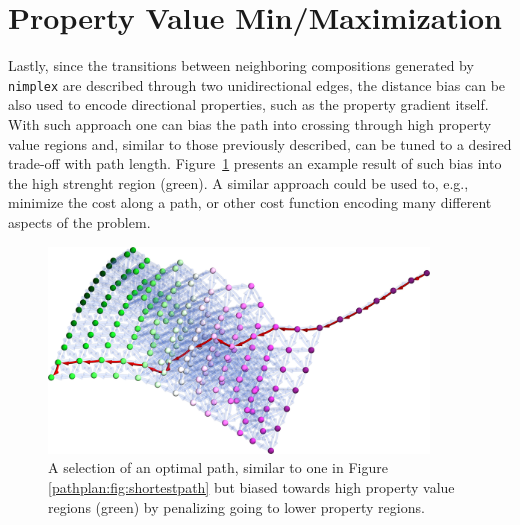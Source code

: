 \section{Property Value Min/Maximization} \label{pathplan:sec:minmax}

Lastly, since the transitions between neighboring compositions generated by \texttt{nimplex} are described through two unidirectional edges, the distance bias can be also used to encode directional properties, such as the property gradient itself. With such approach one can bias the path into crossing through high property value regions and, similar to those previously described, can be tuned to a desired trade-off with path length. Figure~\ref{pathplan:fig:highrmsad} presents an example result of such bias into the high strenght region (green). A similar approach could be used to, e.g., minimize the cost along a path, or other cost function encoding many different aspects of the problem.

\begin{figure}[H]
    \centering
    \includegraphics[width=0.9\textwidth]{pathplanning/InfeasibilityGliding_HighRMSAD.png}
    \caption{A selection of an optimal path, similar to one in Figure \ref{pathplan:fig:shortestpath} but biased towards high property value regions (green) by penalizing going to lower property regions.}
    \label{pathplan:fig:highrmsad}
\end{figure}


\printbibliography[heading=subbibintoc]